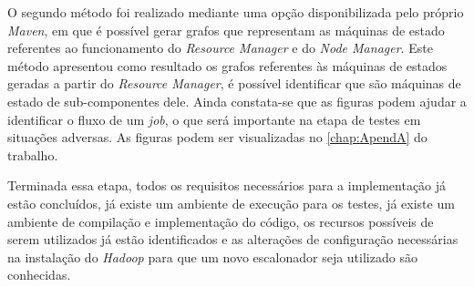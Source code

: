 O segundo método foi realizado mediante uma opção disponibilizada pelo próprio \emph{Maven}, em que é possível gerar grafos que representam as máquinas de estado referentes ao funcionamento do \emph{Resource Manager} e do \emph{Node Manager}. Este método apresentou como resultado os grafos referentes às máquinas de estados geradas a partir do \emph{Resource Manager}, é possível identificar que são máquinas de estado de sub-componentes dele. Ainda constata-se que as figuras podem ajudar a identificar o fluxo de um \emph{job}, o que será importante na etapa de testes em situações adversas. As figuras podem ser visualizadas no \autoref{chap:ApendA} do trabalho.

Terminada essa etapa, todos os requisitos necessários para a implementação já estão concluídos, já existe um ambiente de execução para os testes, já existe um ambiente de compilação e implementação do código, os recursos possíveis de serem utilizados já estão identificados e as alterações de configuração necessárias na instalação do \emph{Hadoop} para que um novo escalonador seja utilizado são conhecidas.